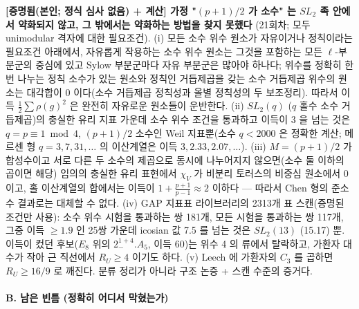 \begin{enumerate}
  \textbf{{[}증명됨(본인; 정식 심사 없음) + 계산{]} 가정 "\((p+1)/2\) 가 소수" 는 \(SL_2\) 족 안에서 약화되지 않고, 그 밖에서는 약화하는 방법을 찾지 못했다} (21회차; 모두 unimodular 격자에 대한 필요조건). (i) 모든 소수 위수 원소가 자유이거나 정칙이라는 필요조건 아래에서, 자유롭게 작용하는 소수 위수 원소는 그것을 포함하는 모든 \(\ell\)-부분군의 중심에 있고 Sylow 부분군마다 자유 부분군은 많아야 하나다; 위수를 정확히 한 번 나누는 정칙 소수가 있는 원소와 정칙인 거듭제곱을 갖는 소수 거듭제곱 위수의 원소는 대각합이 0 이다(소수 거듭제곱 정칙성과 올별 정칙성의 두 보조정리). 따라서 이득 \(\tfrac12\sum\rho(g)^2\) 은 완전히 자유로운 원소들이 운반한다. (ii) \(SL_2(q)\) (\(q\) 홀수 소수 거듭제곱)의 충실한 유리 지표 가운데 소수 위수 조건을 통과하고 이득이 3 을 넘는 것은 \(q=p\equiv1\bmod4\), \((p+1)/2\) 소수인 Weil 지표뿐(소수 \(q<2000\) 은 정확한 계산; 메르센 형 \(q=3,7,31,\dots\) 의 이산계열은 이득 \(3,2.33,2.07,\dots\)). (iii) \(M=(p+1)/2\) 가 합성수이고 서로 다른 두 소수의 제곱으로 동시에 나누어지지 않으면(소수 둘 이하의 곱이면 해당) 임의의 충실한 유리 표현에서 \(\chi_V\) 가 비분리 토러스의 비중심 원소에서 0 이고, 홀 이산계열의 합에서는 이득이 \(1+\tfrac{p+1}{p-1}\approx2\) 이하다 --- 따라서 Chen 형의 준소수 결과로는 대체할 수 없다. (iv) GAP 지표표 라이브러리의 2313개 표 스캔(증명된 조건만 사용): 소수 위수 시험을 통과하는 쌍 181개, 모든 시험을 통과하는 쌍 117개, 그중 이득 \(\ge1.9\) 인 25쌍 가운데 icosian 값 7.5 를 넘는 것은 \(SL_2(13)\) (15.17) 뿐. 이득이 컸던 후보(\(E_8\) 위의 \(2^{1+4}_-.A_5\), 이득 60)는 위수 4 의 류에서 탈락하고, 가환자 대수가 작아 근 직선에서 \(R_U\ge4\) 이기도 하다. (v) Leech 에 가환자의 \(C_3\) 를 곱하면 \(R_U\ge16/9\) 로 깨진다. 분류 정리가 아니라 구조 논증 + 스캔 수준의 증거다.
\end{enumerate}

\hypertarget{b.-uxb0a8uxc740-uxbe48uxd2c8-uxc815uxd655uxd788-uxc5b4uxb514uxc11c-uxb9c9uxd614uxb294uxac00}{%
\paragraph{B. 남은 빈틈 (정확히 어디서 막혔는가)}\label{b.-uxb0a8uxc740-uxbe48uxd2c8-uxc815uxd655uxd788-uxc5b4uxb514uxc11c-uxb9c9uxd614uxb294uxac00}}


